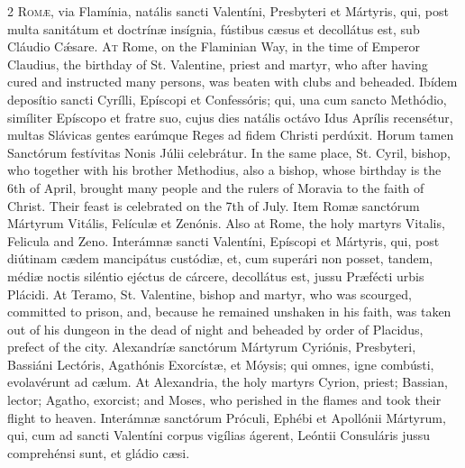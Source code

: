 \begin{paracol}{2}
\lettrine[lines=1]{R}{omæ,} via Flamínia, natális sancti Valentíni, 
 Presbyteri et Mártyris, qui, post multa sanitátum et doctrínæ insígnia, 
 fústibus cæsus et decollátus est, sub Cláudio Cǽsare.
\switchcolumn
{}
\lettrine[lines=1]{A}{t} Rome, on the Flaminian Way, in the time of Emperor Claudius, the birthday 
 of St. Valentine, priest and martyr, who after having cured and instructed 
 many persons, was beaten with clubs and beheaded.
\switchcolumn*
{}
Ibídem deposítio sancti Cyrílli, Epíscopi et Confessóris; qui, una cum 
 sancto Methódio, simíliter Epíscopo et fratre suo, cujus dies natális octávo 
 Idus Aprílis recensétur, multas Slávicas gentes 
 earúmque Reges ad fidem Christi perdúxit. Horum tamen Sanctórum 
 festívitas Nonis Júlii celebrátur.
\switchcolumn
{}
In the same place, St. Cyril, bishop, who together with his brother 
 Methodius, also a bishop, whose birthday is the 6th of April, brought many 
 people and the rulers of Moravia to the faith of Christ. Their feast 
 is celebrated on the 7th of July.
\switchcolumn*
{}
Item Romæ sanctórum Mártyrum Vitális, Felículæ 
 et Zenónis.
\switchcolumn
{}
Also at Rome, the holy martyrs Vitalis, Felicula and Zeno.
\switchcolumn*
{}
Interámnæ sancti Valentíni, Epíscopi et Mártyris, 
 qui, post diútinam cædem mancipátus custódiæ, et, cum superári non posset, 
 tandem, médiæ noctis siléntio ejéctus de cárcere, decollátus est, jussu 
 Præfécti urbis Plácidi.
\switchcolumn
{}
At Teramo, St. Valentine, bishop and martyr, who was scourged, committed to 
 prison, and, because he remained unshaken in his faith, was taken out of his 
 dungeon in the dead of night and beheaded by order of Placidus, prefect of 
 the city.
\switchcolumn*
{}
Alexandríæ sanctórum Mártyrum Cyriónis, 
 Presbyteri, Bassiáni Lectóris, Agathónis Exorcístæ, et Móysis; qui omnes, 
 igne combústi, evolavérunt ad cælum.
\switchcolumn
{}
At Alexandria, the holy martyrs Cyrion, priest; Bassian, lector; Agatho, 
 exorcist; and Moses, who perished in the flames and took their flight to 
 heaven.
\switchcolumn*
{}
Interámnæ sanctórum Próculi, Ephébi et 
 Apollónii Mártyrum, qui, cum ad sancti Valentíni corpus vigílias ágerent, 
 Leóntii Consuláris jussu comprehénsi sunt, et gládio cæsi.

\end{paracol}
